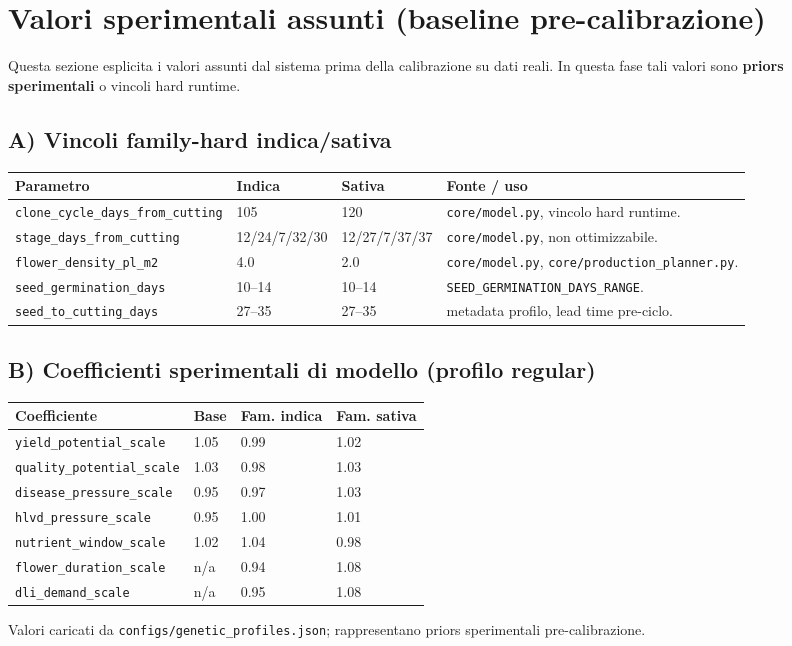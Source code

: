 ﻿\documentclass[11pt,a4paper]{report}
\begin{document}
\section{Valori sperimentali assunti (baseline pre-calibrazione)}
Questa sezione esplicita i valori assunti dal sistema prima della calibrazione su dati reali.
In questa fase tali valori sono \textbf{priors sperimentali} o vincoli hard runtime.

\subsection*{A) Vincoli family-hard indica/sativa}
\begin{longtable}{@{}p{4.2cm}p{2.1cm}p{2.1cm}p{4.5cm}@{}}
\toprule
Parametro & Indica & Sativa & Fonte / uso \\ \midrule
\texttt{clone\_cycle\_days\_from\_cutting} & 105 & 120 & \texttt{core/model.py}, vincolo hard runtime. \\
\texttt{stage\_days\_from\_cutting} & 12/24/7/32/30 & 12/27/7/37/37 & \texttt{core/model.py}, non ottimizzabile. \\
\texttt{flower\_density\_pl\_m2} & 4.0 & 2.0 & \texttt{core/model.py}, \texttt{core/production\_planner.py}. \\
\texttt{seed\_germination\_days} & 10--14 & 10--14 & \texttt{SEED\_GERMINATION\_DAYS\_RANGE}. \\
\texttt{seed\_to\_cutting\_days} & 27--35 & 27--35 & metadata profilo, lead time pre-ciclo. \\
\bottomrule
\end{longtable}

\subsection*{B) Coefficienti sperimentali di modello (profilo regular)}
\begin{longtable}{@{}p{4.3cm}p{2.0cm}p{2.0cm}p{2.0cm}@{}}
\toprule
Coefficiente & Base & Fam. indica & Fam. sativa \\ \midrule
\texttt{yield\_potential\_scale} & 1.05 & 0.99 & 1.02 \\
\texttt{quality\_potential\_scale} & 1.03 & 0.98 & 1.03 \\
\texttt{disease\_pressure\_scale} & 0.95 & 0.97 & 1.03 \\
\texttt{hlvd\_pressure\_scale} & 0.95 & 1.00 & 1.01 \\
\texttt{nutrient\_window\_scale} & 1.02 & 1.04 & 0.98 \\
\texttt{flower\_duration\_scale} & n/a & 0.94 & 1.08 \\
\texttt{dli\_demand\_scale} & n/a & 0.95 & 1.08 \\
\bottomrule
\end{longtable}
Valori caricati da \texttt{configs/genetic\_profiles.json}; rappresentano priors sperimentali pre-calibrazione.
\end{document}
